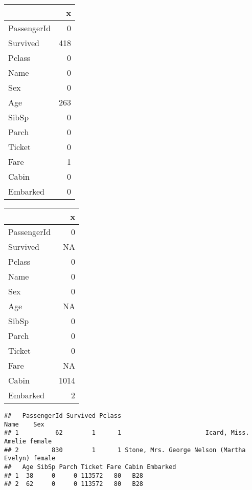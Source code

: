 \documentclass[
]{article}
\newenvironment{Shaded}{\begin{snugshade}}{\end{snugshade}}
\newcommand{\CommentTok}[1]{\textcolor[rgb]{0.56,0.35,0.01}{\textit{#1}}}
\newcommand{\FunctionTok}[1]{\textcolor[rgb]{0.00,0.00,0.00}{#1}}
\newcommand{\NormalTok}[1]{#1}
\newcommand{\SpecialCharTok}[1]{\textcolor[rgb]{0.00,0.00,0.00}{#1}}
\newcommand{\StringTok}[1]{\textcolor[rgb]{0.31,0.60,0.02}{#1}}
\begin{document}
\begin{table}

\centering
\begin{tabular}[t]{l|r}
\hline
  & x\\
\hline
PassengerId & 0\\
\hline
Survived & 418\\
\hline
Pclass & 0\\
\hline
Name & 0\\
\hline
Sex & 0\\
\hline
Age & 263\\
\hline
SibSp & 0\\
\hline
Parch & 0\\
\hline
Ticket & 0\\
\hline
Fare & 1\\
\hline
Cabin & 0\\
\hline
Embarked & 0\\
\hline
\end{tabular}
\centering
\begin{tabular}[t]{l|r}
\hline
  & x\\
\hline
PassengerId & 0\\
\hline
Survived & NA\\
\hline
Pclass & 0\\
\hline
Name & 0\\
\hline
Sex & 0\\
\hline
Age & NA\\
\hline
SibSp & 0\\
\hline
Parch & 0\\
\hline
Ticket & 0\\
\hline
Fare & NA\\
\hline
Cabin & 1014\\
\hline
Embarked & 2\\
\hline
\end{tabular}
\end{table}

\begin{Shaded}
\end{Shaded}

\begin{verbatim}
##   PassengerId Survived Pclass                                      Name    Sex
## 1          62        1      1                       Icard, Miss. Amelie female
## 2         830        1      1 Stone, Mrs. George Nelson (Martha Evelyn) female
##   Age SibSp Parch Ticket Fare Cabin Embarked
## 1  38     0     0 113572   80   B28         
## 2  62     0     0 113572   80   B28
\end{verbatim}
\end{document}
